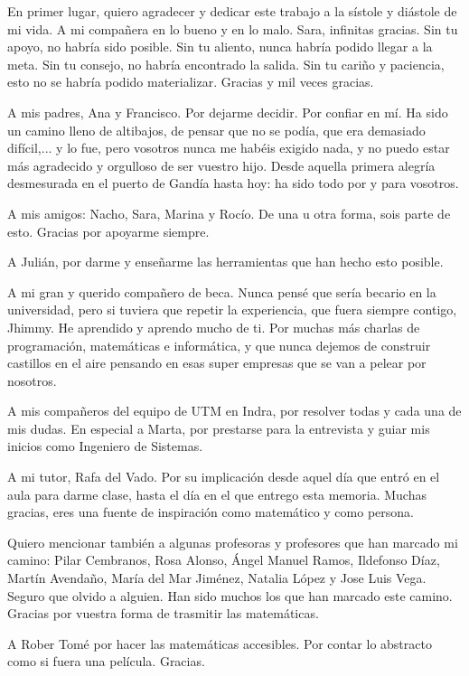\documentclass[12pt,a4paper]{book}
\begin{document}
En primer lugar, quiero agradecer y dedicar este trabajo a la sístole y diástole de mi vida. A mi compañera en lo bueno y en lo malo. Sara, infinitas gracias. Sin tu apoyo, no habría sido posible. Sin tu aliento, nunca habría podido llegar a la meta. Sin tu consejo, no habría encontrado la salida. Sin tu cariño y paciencia, esto no se habría podido materializar. Gracias y mil veces gracias. 

A mis padres, Ana y Francisco. Por dejarme decidir. Por confiar en mí. Ha sido un camino lleno de altibajos, de pensar que no se podía, que era demasiado difícil,... y lo fue, pero vosotros nunca me habéis exigido nada, y no puedo estar más agradecido y orgulloso de ser vuestro hijo. Desde aquella primera alegría desmesurada en el puerto de Gandía hasta hoy: ha sido todo por y para vosotros.

A mis amigos: Nacho, Sara, Marina y Rocío. De una u otra forma, sois parte de esto. Gracias por apoyarme siempre. 

A Julián, por darme y enseñarme las herramientas que han hecho esto posible. 

A mi gran y querido compañero de beca. Nunca pensé que sería becario en la universidad, pero si tuviera que repetir la experiencia, que fuera siempre contigo, Jhimmy. He aprendido y aprendo mucho de ti. Por muchas más charlas de programación, matemáticas e informática, y que nunca dejemos de construir castillos en el aire pensando en esas super empresas que se van a pelear por nosotros.

A mis compañeros del equipo de UTM en Indra, por resolver todas y cada una de mis dudas. En especial a Marta, por prestarse para la entrevista y guiar mis inicios como Ingeniero de Sistemas. 

A mi tutor, Rafa del Vado. Por su implicación desde aquel día que entró en el aula para darme clase, hasta el día en el que entrego esta memoria. Muchas gracias, eres una fuente de inspiración como matemático y como persona.  

Quiero mencionar también a algunas profesoras y profesores que han marcado mi camino: Pilar Cembranos, Rosa Alonso, Ángel Manuel Ramos, Ildefonso Díaz, Martín Avendaño, María del Mar Jiménez, Natalia López y Jose Luis Vega. Seguro que olvido a alguien. Han sido muchos los que han marcado este camino. Gracias por vuestra forma de trasmitir las matemáticas. 

A Rober Tomé por hacer las matemáticas accesibles. Por contar lo abstracto como si fuera una película. Gracias. 
\end{document}
